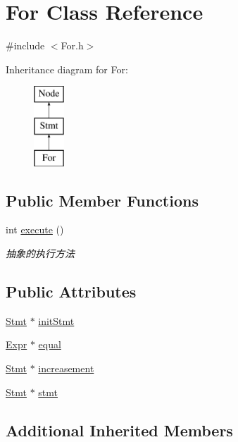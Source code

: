\hypertarget{class_for}{}\section{For Class Reference}
\label{class_for}


{\ttfamily \#include $<$For.\+h$>$}

Inheritance diagram for For\+:\begin{figure}[H]
\begin{center}
\leavevmode
\includegraphics[height=3.000000cm]{class_for}
\end{center}
\end{figure}
\subsection*{Public Member Functions}
\begin{DoxyCompactItemize}
\item 
int \hyperlink{class_for_ad099d6d48c640dd5127285e59bbaba15}{execute} ()
\begin{DoxyCompactList}\small\item\em 抽象的执行方法 \end{DoxyCompactList}\end{DoxyCompactItemize}
\subsection*{Public Attributes}
\begin{DoxyCompactItemize}
\item 
\hyperlink{class_stmt}{Stmt} $\ast$ \hyperlink{class_for_a056889fe255686012e6a9197c2d514e7}{init\+Stmt}
\item 
\hyperlink{class_expr}{Expr} $\ast$ \hyperlink{class_for_a215e09b14cddca31190dc69cd783d886}{equal}
\item 
\hyperlink{class_stmt}{Stmt} $\ast$ \hyperlink{class_for_a2d0ace8af086310ef5a11d9641dc81e6}{increasement}
\item 
\hyperlink{class_stmt}{Stmt} $\ast$ \hyperlink{class_for_af269abab55eae120cccbd1c76b0c5011}{stmt}
\end{DoxyCompactItemize}
\subsection*{Additional Inherited Members}


